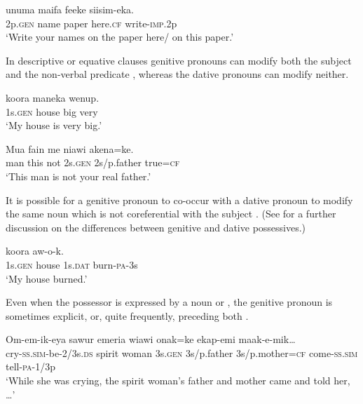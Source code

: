 \ea%
\label{ex:3:x567}
\gll {} unuma maifa feeke siisim-eka. \\
2p.\textsc{gen} name paper here.\textsc{cf} write-\textsc{imp}.2p\\
\glt`Write your names on the paper here/ on this paper.'
\z

In descriptive or equative clauses genitive pronouns can modify both the subject   and the non-verbal predicate  , whereas the dative pronouns can modify neither. 

\ea%
\label{ex:3:x568}
\gll {} koora maneka wenup. \\
1s.\textsc{gen} house big very\\
\glt`My house is very big.'
\z

\ea%
\label{ex:3:x569}
\gll Mua fain me  niawi akena=ke. \\
man this not 2s.\textsc{gen} 2s/p.father true=\textsc{cf}\\
\glt`This man is not your real father.'
\z

It is possible for a genitive pronoun to co-occur with a dative pronoun to modify the same noun which is not coreferential with the subject . (See  for a further discussion on the differences between genitive and dative possessives.)

\ea%
\label{ex:3:x570}
\gll {} koora  aw-o-k. \\
1s.\textsc{gen} house 1s.\textsc{dat} burn-\textsc{pa}-3s\\
\glt`My house burned.'
\z

Even when the possessor is expressed by a noun or , the genitive pronoun is sometimes explicit,    or, quite frequently, preceding both .

\ea%
\label{ex:3:x573}
\gll Om-em-ik-eya sawur emeria  wiawi onak=ke ekap-emi maak-e-mik{\dots}
\\
cry-\textsc{ss}.\textsc{sim}-be-2/3s.\textsc{ds} spirit woman 3s.\textsc{gen} 3s/p.father 3s/p.mother=\textsc{cf} come-\textsc{ss}.\textsc{sim} tell-\textsc{pa}-1/3p\\
\glt`While she was crying, the spirit woman's father and mother came and told her, {\dots}'
\z

